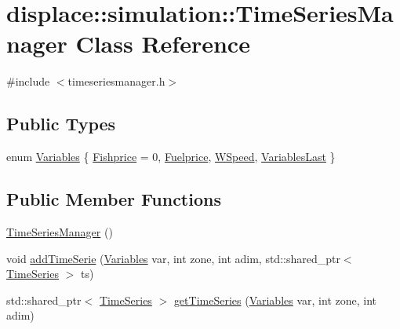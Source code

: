 \hypertarget{classdisplace_1_1simulation_1_1_time_series_manager}{}\section{displace\+::simulation\+::Time\+Series\+Manager Class Reference}
\label{classdisplace_1_1simulation_1_1_time_series_manager}


{\ttfamily \#include $<$timeseriesmanager.\+h$>$}

\subsection*{Public Types}
\begin{DoxyCompactItemize}
\item 
enum \mbox{\hyperlink{classdisplace_1_1simulation_1_1_time_series_manager_ae4e516e8c6ce2707d48ffafec4613ece}{Variables}} \{ \mbox{\hyperlink{classdisplace_1_1simulation_1_1_time_series_manager_ae4e516e8c6ce2707d48ffafec4613eceafbd6bb29f771353434f015ab47736109}{Fishprice}} = 0, 
\mbox{\hyperlink{classdisplace_1_1simulation_1_1_time_series_manager_ae4e516e8c6ce2707d48ffafec4613ecea2ab1cdbe22daea7ccf39fab2f356b1b7}{Fuelprice}}, 
\mbox{\hyperlink{classdisplace_1_1simulation_1_1_time_series_manager_ae4e516e8c6ce2707d48ffafec4613ecea0676af514d09a27096d4b06789d8b748}{W\+Speed}}, 
\mbox{\hyperlink{classdisplace_1_1simulation_1_1_time_series_manager_ae4e516e8c6ce2707d48ffafec4613eceae5d1d659ac36aca8ad7aafb347cf72fb}{Variables\+Last}}
 \}
\end{DoxyCompactItemize}
\subsection*{Public Member Functions}
\begin{DoxyCompactItemize}
\item 
\mbox{\hyperlink{classdisplace_1_1simulation_1_1_time_series_manager_a906c14b53caf1c72df0460f2aaf6bc32}{Time\+Series\+Manager}} ()
\item 
void \mbox{\hyperlink{classdisplace_1_1simulation_1_1_time_series_manager_a46213ef3b8dea4dd2f959e946c11fda1}{add\+Time\+Serie}} (\mbox{\hyperlink{classdisplace_1_1simulation_1_1_time_series_manager_ae4e516e8c6ce2707d48ffafec4613ece}{Variables}} var, int zone, int adim, std\+::shared\+\_\+ptr$<$ \mbox{\hyperlink{classdisplace_1_1simulation_1_1_time_series}{Time\+Series}} $>$ ts)
\item 
std\+::shared\+\_\+ptr$<$ \mbox{\hyperlink{classdisplace_1_1simulation_1_1_time_series}{Time\+Series}} $>$ \mbox{\hyperlink{classdisplace_1_1simulation_1_1_time_series_manager_ac636e5a7e758a29208ce0c75462199e4}{get\+Time\+Series}} (\mbox{\hyperlink{classdisplace_1_1simulation_1_1_time_series_manager_ae4e516e8c6ce2707d48ffafec4613ece}{Variables}} var, int zone, int adim)
\end{DoxyCompactItemize}
